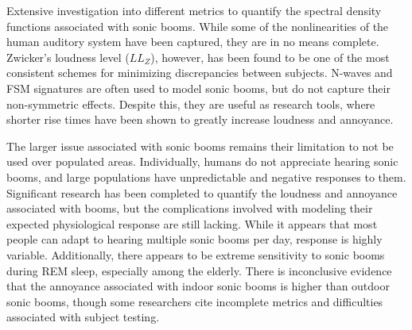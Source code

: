 \documentclass[]{aiaa-tc}%
\begin{document}
Extensive investigation into different metrics to quantify the spectral density functions associated with sonic booms. While some of the nonlinearities of the human auditory system have been captured, they are in no means complete. Zwicker's loudness level ($LL_Z$), however, has been found to be one of the most consistent schemes for minimizing discrepancies between subjects. N-waves and FSM signatures are often used to model sonic booms, but do not capture their non-symmetric effects. Despite this, they are useful as research tools, where shorter rise times have been shown to greatly increase loudness and annoyance.

The larger issue associated with sonic booms remains their limitation to not be used over populated areas. Individually, humans do not appreciate hearing sonic booms, and large populations have unpredictable and negative responses to them. Significant research has been completed to quantify the loudness and annoyance associated with booms, but the complications involved with modeling their expected physiological response are still lacking. While it appears that most people can adapt to hearing multiple sonic booms per day, response is highly variable. Additionally, there appears to be extreme sensitivity to sonic booms during REM sleep, especially among the elderly. There is inconclusive evidence that the annoyance associated with indoor sonic booms is higher than outdoor sonic booms, though some researchers cite incomplete metrics and difficulties associated with subject testing.



\end{document}
